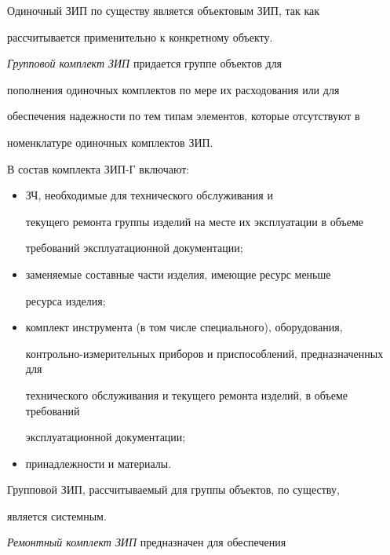      


     Одиночный ЗИП по существу является объектовым ЗИП, так как 


рассчитывается применительно к конкретному объекту.


     


     \textit{Групповой комплект ЗИП} придается группе объектов для 


пополнения одиночных комплектов по мере их расходования или для 


обеспечения надежности по тем типам элементов, которые отсутствуют в 


номенклатуре одиночных комплектов ЗИП.


          В состав комплекта ЗИП-Г включают:


     \begin{itemize}


     \item ЗЧ, необходимые для технического обслуживания и 


текущего ремонта группы изделий на месте их эксплуатации в объеме 


требований эксплуатационной документации;


     \item заменяемые составные части изделия, имеющие ресурс меньше 


ресурса изделия;


     \item комплект инструмента (в том числе специального), оборудования, 


конт\-роль\-но-из\-ме\-ри\-тель\-ных приборов и приспособлений, предназначенных для 


технического обслуживания и текущего ремонта изделий, в объеме требований 


эксплуатационной документации;


     \item принадлежности и материалы.


     \end{itemize}


     


     Групповой ЗИП, рассчитываемый для группы объектов, по существу, 


является системным.


     


     \textit{Ремонтный комплект ЗИП} предназначен для обеспечения 



